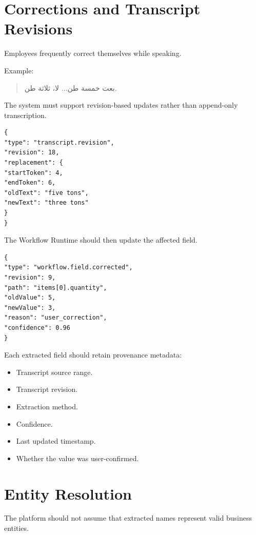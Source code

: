 \documentclass[11pt,a4paper]{article}
\begin{document}
\section{Corrections and Transcript Revisions}

Employees frequently correct themselves while speaking.

Example:

\begin{quote}
\textarabic{
بعت خمسة طن... لا، ثلاثة طن.
}
\end{quote}

The system must support revision-based updates rather than append-only
transcription.

\begin{lstlisting}[language={},caption={Transcript correction event}]
{
"type": "transcript.revision",
"revision": 18,
"replacement": {
"startToken": 4,
"endToken": 6,
"oldText": "five tons",
"newText": "three tons"
}
}
\end{lstlisting}

The Workflow Runtime should then update the affected field.

\begin{lstlisting}[language={},caption={Structured field correction}]
{
"type": "workflow.field.corrected",
"revision": 9,
"path": "items[0].quantity",
"oldValue": 5,
"newValue": 3,
"reason": "user_correction",
"confidence": 0.96
}
\end{lstlisting}

Each extracted field should retain provenance metadata:

\begin{itemize}
\item Transcript source range.
\item Transcript revision.
\item Extraction method.
\item Confidence.
\item Last updated timestamp.
\item Whether the value was user-confirmed.
\end{itemize}

\section{Entity Resolution}

The platform should not assume that extracted names represent valid
business entities.
\end{document}
